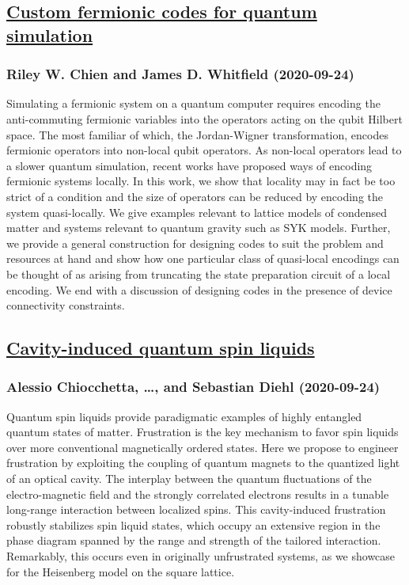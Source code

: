 \subsection*{\href{http://arxiv.org/abs/2009.11860v1}{Custom fermionic codes for quantum simulation}}
\subsubsection*{Riley W. Chien and James D. Whitfield (2020-09-24)}
Simulating a fermionic system on a quantum computer requires encoding the
anti-commuting fermionic variables into the operators acting on the qubit
Hilbert space. The most familiar of which, the Jordan-Wigner transformation,
encodes fermionic operators into non-local qubit operators. As non-local
operators lead to a slower quantum simulation, recent works have proposed ways
of encoding fermionic systems locally. In this work, we show that locality may
in fact be too strict of a condition and the size of operators can be reduced
by encoding the system quasi-locally. We give examples relevant to lattice
models of condensed matter and systems relevant to quantum gravity such as SYK
models. Further, we provide a general construction for designing codes to suit
the problem and resources at hand and show how one particular class of
quasi-local encodings can be thought of as arising from truncating the state
preparation circuit of a local encoding. We end with a discussion of designing
codes in the presence of device connectivity constraints.

\subsection*{\href{http://arxiv.org/abs/2009.11856v1}{Cavity-induced quantum spin liquids}}
\subsubsection*{Alessio Chiocchetta, \dots, and Sebastian Diehl (2020-09-24)}
Quantum spin liquids provide paradigmatic examples of highly entangled
quantum states of matter. Frustration is the key mechanism to favor spin
liquids over more conventional magnetically ordered states. Here we propose to
engineer frustration by exploiting the coupling of quantum magnets to the
quantized light of an optical cavity. The interplay between the quantum
fluctuations of the electro-magnetic field and the strongly correlated
electrons results in a tunable long-range interaction between localized spins.
This cavity-induced frustration robustly stabilizes spin liquid states, which
occupy an extensive region in the phase diagram spanned by the range and
strength of the tailored interaction. Remarkably, this occurs even in
originally unfrustrated systems, as we showcase for the Heisenberg model on the
square lattice.

